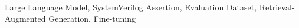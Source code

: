 \documentclass[conference,9pt]{IEEEtran}
\begin{document}
\IEEEpubidadjcol
\begin{IEEEkeywords}
Large Language Model, SystemVerilog Assertion, Evaluation Dataset, Retrieval-Augmented Generation, Fine-tuning
\end{IEEEkeywords}






% 


\onecolumn
\newpage
\appendix


\end{document}
